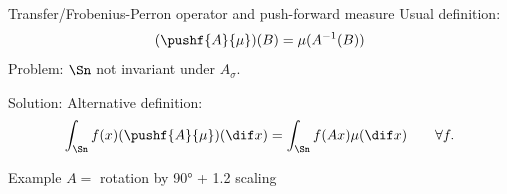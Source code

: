 \documentclass{beamer}
\begin{document}
  \begin{frame}{Transfer/Frobenius-Perron operator and push-forward measure}
    Usual definition:
    \[ (\pushf{A}{\mu})(B) = \mu(A^{-1}(B)) \]
    \alert{Problem}: $\Sn$ not invariant under $A_\sigma$.

    \alert{Solution}: Alternative definition:
    \[ \int_{\Sn} f(x) (\pushf{A}{\mu})(\dif x) = \int_{\Sn} f(Ax) \mu(\dif x) \qquad \forall f. \]

    \begin{alert}{Example}
      $A = $ rotation by \ang{90} + 1.2 scaling
    \end{alert}

    \begin{center}
    \end{center}
  \end{frame}
\end{document}
